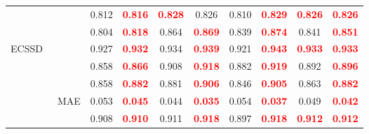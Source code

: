 \documentclass[runningheads]{llncs}
\begin{document}
\begin{table}[H]
{\begin{tabular}{l|l|cc|cc|cc|cc}
                                               &                                                      & 0.812                           & \textcolor{red}{\textbf{0.816}} & \textcolor{red}{\textbf{0.828}} & 0.826                           & 0.810 & \textcolor{red}{\textbf{0.829}} & \textcolor{red}{\textbf{0.826}} & \textcolor{red}{\textbf{0.826}} \\
                                               &                                                      & 0.804                           & \textcolor{red}{\textbf{0.818}} & 0.864                           & \textcolor{red}{\textbf{0.869}} & 0.839 & \textcolor{red}{\textbf{0.874}} & 0.841                           & \textcolor{red}{\textbf{0.851}} \\ \hline
   \multirow{6}{*}{ECSSD~\cite{ECSSD}}         &                                                    & 0.927                           & \textcolor{red}{\textbf{0.932}} & 0.934                           & \textcolor{red}{\textbf{0.939}} & 0.921 & \textcolor{red}{\textbf{0.943}} & \textcolor{red}{\textbf{0.933}} & \textcolor{red}{\textbf{0.933}} \\
                                               &                                                    & 0.858                           & \textcolor{red}{\textbf{0.866}} & 0.908                           & \textcolor{red}{\textbf{0.918}} & 0.882 & \textcolor{red}{\textbf{0.919}} & 0.892                           & \textcolor{red}{\textbf{0.896}} \\
                                               &                                         & 0.858                           & \textcolor{red}{\textbf{0.882}} & 0.881                           & \textcolor{red}{\textbf{0.906}} & 0.846 & \textcolor{red}{\textbf{0.905}} & 0.863                           & \textcolor{red}{\textbf{0.882}} \\
                                               & MAE                                                         & 0.053                           & \textcolor{red}{\textbf{0.045}} & 0.044                           & \textcolor{red}{\textbf{0.035}} & 0.054 & \textcolor{red}{\textbf{0.037}} & 0.049                           & \textcolor{red}{\textbf{0.042}} \\
                                               &                                                      & 0.908                           & \textcolor{red}{\textbf{0.910}} & 0.911                           & \textcolor{red}{\textbf{0.918}} & 0.897 & \textcolor{red}{\textbf{0.918}} & \textcolor{red}{\textbf{0.912}} & \textcolor{red}{\textbf{0.912}} \\

\end{tabular}}
\end{table}
\end{document}
